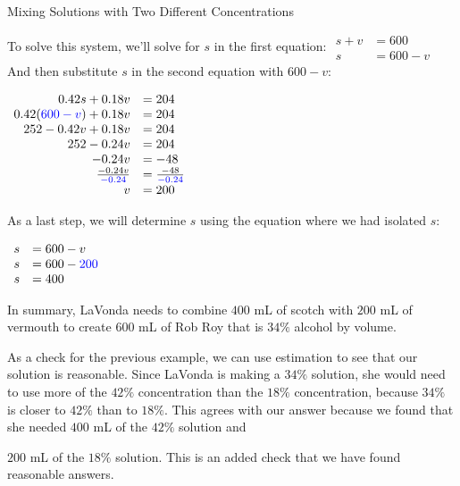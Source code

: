 \documentclass[nooutcomes]{ximera}
\begin{document}
\begin{example}{Mixing Solutions with Two Different Concentrations}
\begin{explanation}
          To solve this system, we'll solve for $s$ in the first equation:
$
         \begin{array}{rl}
            s+v&=600 \\
            s&=600-v
       \end{array}
$
          And then substitute $s$ in the second equation with $600-v$:
\begin{center}
$
      \begin{array}{rl}
            0.42s+0.18v&=204 \\
            0.42({\color{blue}{{600-v}}})+0.18v&=204\\
            252-0.42v+0.18v&=204\\
            252-0.24v&=204\\
            -0.24v&=-48\\
            \frac{-0.24v}{{\color{blue}{{-0.24}}}}&=\frac{-48}{{\color{blue}{{-0.24}}}}\\
            v&=200
       \end{array}
$
\end{center}
          As a last step,
          we will determine $s$ using the equation where we had isolated $s$:
\begin{center}          
$
\begin{array}{rl}
            s&=600-v\\
            s&=600-{\color{blue}{{200}}}\\
            s&=400
       \end{array}
$
\end{center}
          In summary, LaVonda needs to combine
$400$ mL
          of scotch with
       $200$ mL
          of vermouth to create
   $600$ mL
          of Rob Roy that is $34\%$ alcohol by volume.
\end{explanation}
\end{example}

    
      As a check for the previous example,
      we can use estimation
      to see that our solution is reasonable.
      Since LaVonda is making a $34\%$ solution,
      she would need to use more of the $42\%$ concentration than the $18\%$ concentration,
      because $34\%$ is closer to $42\%$ than to $18\%$.
      This agrees with our answer because we found that she needed
  $400$ mL
      of the $42\%$ solution and
      
        $200$ mL
      of the $18\%$ solution.
      This is an added check that we have found reasonable answers.
\end{document}
